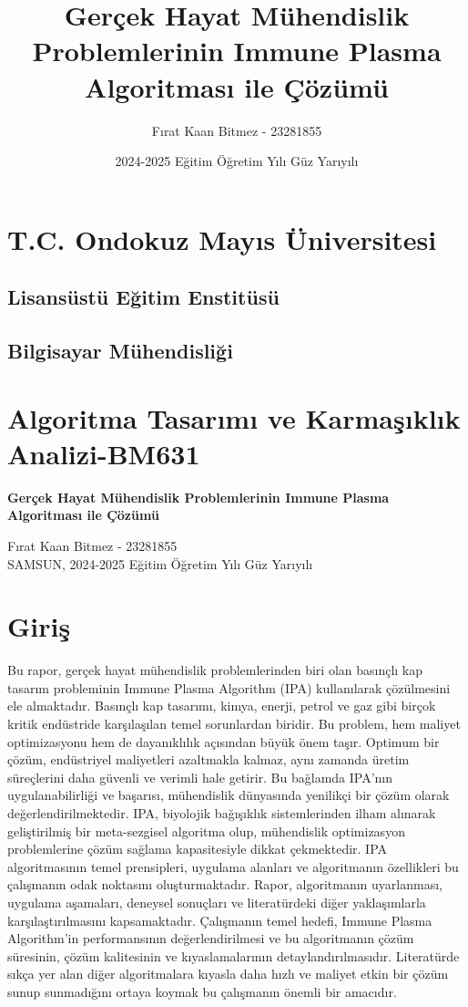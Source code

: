 \documentclass[12pt,a4paper]{article}
\title{\textbf{Gerçek Hayat Mühendislik Problemlerinin Immune Plasma Algoritması ile Çözümü}}
\author{Fırat Kaan Bitmez - 23281855}
\date{2024-2025 Eğitim Öğretim Yılı Güz Yarıyılı}
\begin{document}
\maketitle

\section*{T.C. Ondokuz Mayıs Üniversitesi}
\subsection*{Lisansüstü Eğitim Enstitüsü}
\subsection*{Bilgisayar Mühendisliği}

\section*{Algoritma Tasarımı ve Karmaşıklık Analizi-BM631}
\vspace{0.5cm}

\begin{center}
\textbf{Gerçek Hayat Mühendislik Problemlerinin Immune Plasma Algoritması ile Çözümü}
\end{center}

\vspace{0.5cm}
\begin{flushright}
Fırat Kaan Bitmez - 23281855\\
SAMSUN, 2024-2025 Eğitim Öğretim Yılı Güz Yarıyılı
\end{flushright}

\section{Giriş}
Bu rapor, gerçek hayat mühendislik problemlerinden biri olan basınçlı kap tasarım probleminin Immune Plasma Algorithm (IPA) kullanılarak çözülmesini ele almaktadır. Basınçlı kap tasarımı, kimya, enerji, petrol ve gaz gibi birçok kritik endüstride karşılaşılan temel sorunlardan biridir. Bu problem, hem maliyet optimizasyonu hem de dayanıklılık açısından büyük önem taşır. Optimum bir çözüm, endüstriyel maliyetleri azaltmakla kalmaz, aynı zamanda üretim süreçlerini daha güvenli ve verimli hale getirir. Bu bağlamda IPA'nın uygulanabilirliği ve başarısı, mühendislik dünyasında yenilikçi bir çözüm olarak değerlendirilmektedir. IPA, biyolojik bağışıklık sistemlerinden ilham alınarak geliştirilmiş bir meta-sezgisel algoritma olup, mühendislik optimizasyon problemlerine çözüm sağlama kapasitesiyle dikkat çekmektedir.
IPA algoritmasının temel prensipleri, uygulama alanları ve algoritmanın özellikleri bu çalışmanın odak noktasını oluşturmaktadır. Rapor, algoritmanın uyarlanması, uygulama aşamaları, deneysel sonuçları ve literatürdeki diğer yaklaşımlarla karşılaştırılmasını kapsamaktadır.
Çalışmanın temel hedefi, Immune Plasma Algorithm'in performansının değerlendirilmesi ve bu algoritmanın çözüm süresinin, çözüm kalitesinin ve kıyaslamalarının detaylandırılmasıdır. Literatürde sıkça yer alan diğer algoritmalara kıyasla daha hızlı ve maliyet etkin bir çözüm sunup sunmadığını ortaya koymak bu çalışmanın önemli bir amacıdır.
\end{document}
